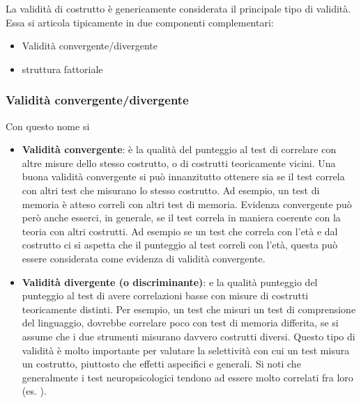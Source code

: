 \documentclass[
  italian,
  letterpaper,
  paper=6in:9in,
  pagesize=pdftex,
  headinclude=on,
  footinclude=on,
  11pt]{scrbook}
\providecommand{\tightlist}{%
  \setlength{\itemsep}{0pt}\setlength{\parskip}{0pt}}
\begin{document}
La validità di costrutto è genericamente considerata il principale tipo
di validità. Essa si articola tipicamente in due componenti
complementari:

\begin{itemize}
\tightlist
\item
  Validità convergente/divergente
\item
  struttura fattoriale
\end{itemize}

\subsubsection{Validità
convergente/divergente}\label{validituxe0-convergentedivergente}

Con questo nome si

\begin{itemize}
\item
  \textbf{Validità convergente}: è la qualità del punteggio al test di
  correlare con altre misure dello stesso costrutto, o di costrutti
  teoricamente vicini. Una buona validità convergente si può
  innanzitutto ottenere sia se il test correla con altri test che
  misurano lo stesso costrutto. Ad esempio, un test di memoria è atteso
  correli con altri test di memoria. Evidenza convergente può però anche
  esserci, in generale, se il test correla in maniera coerente con la
  teoria con altri costrutti. Ad esempio se un test che correla con
  l'età e dal costrutto ci si aspetta che il punteggio al test correli
  con l'età, questa può essere considerata come evidenza di validità
  convergente.
\item
  \textbf{Validità divergente (o discriminante)}: e la qualità punteggio
  del punteggio al test di avere correlazioni basse con misure di
  costrutti teoricamente distinti. Per esempio, un test che misuri un
  test di comprensione del linguaggio, dovrebbe correlare poco con test
  di memoria differita, se si assume che i due strumenti misurano
  davvero costrutti diversi. Questo tipo di validità è molto importante
  per valutare la selettività con cui un test misura un costrutto,
  piuttosto che effetti aspecifici e generali. Si noti che generalmente
  i test neuropsicologici tendono ad essere molto correlati fra loro
  (es. \cite{trevino2021attention,mondini2011enb2}).
\end{itemize}
\end{document}
